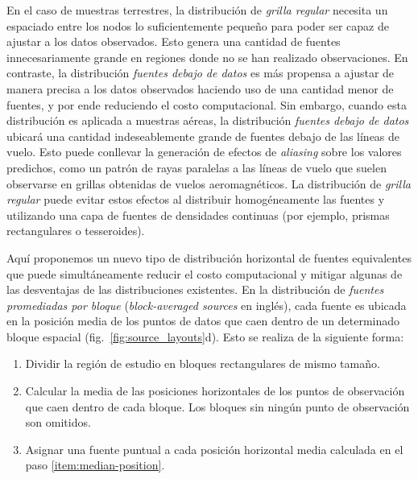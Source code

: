 En el caso de muestras terrestres, la distribución de \emph{grilla regular}
necesita un espaciado entre los nodos lo suficientemente pequeño para poder ser
capaz de ajustar a los datos observados.
Esto genera una cantidad de fuentes innecesariamente grande en regiones donde
no se han realizado observaciones.
En contraste, la distribución \emph{fuentes debajo de datos} es más propensa
a ajustar de manera precisa a los datos observados haciendo uso de una cantidad
menor de fuentes, y por ende reduciendo el costo computacional.
Sin embargo, cuando esta distribución es aplicada a muestras aéreas, la
distribución \emph{fuentes debajo de datos} ubicará una cantidad
indeseablemente grande de fuentes debajo de las líneas de vuelo.
Esto puede conllevar la generación de efectos de \emph{aliasing} sobre los
valores predichos, como un patrón de rayas paralelas a las líneas de vuelo que
suelen observarse en grillas obtenidas de vuelos aeromagnéticos.
La distribución de \emph{grilla regular} puede evitar estos efectos al
distribuir homogéneamente las fuentes y utilizando una capa de fuentes de
densidades continuas (por ejemplo, prismas rectangulares o tesseroides).

Aquí proponemos un nuevo tipo de distribución horizontal de fuentes
equivalentes que puede simultáneamente reducir el costo computacional y mitigar
algunas de las desventajas de las distribuciones existentes.
En la distribución de \emph{fuentes promediadas por bloque}
(\emph{block-averaged sources} en inglés), cada fuente es ubicada en la
posición media de los puntos de datos que caen dentro de un determinado bloque
espacial (fig.~\ref{fig:source_layouts}d).
Esto se realiza de la siguiente forma:

\begin{enumerate}
    \item Dividir la región de estudio en bloques rectangulares de mismo
        tamaño.
    \item \label{item:median-position} Calcular la media de las posiciones
        horizontales de los puntos de observación que caen dentro de cada
        bloque. Los bloques sin ningún punto de observación son omitidos.
    \item Asignar una fuente puntual a cada posición horizontal media calculada
        en el paso \ref{item:median-position}.
\end{enumerate}

